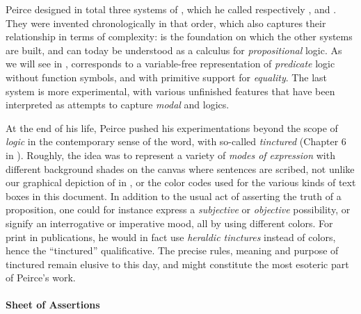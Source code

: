 \begin{scope}
\AP
Peirce designed in total three systems of , which he called respectively
,  and . They were invented
chronologically in that order, which also captures their relationship in terms
of complexity:  is the foundation on which the other systems are
built, and can today be understood as a  calculus for 
\emph{propositional} logic. As we will see in , 
corresponds to a variable-free representation of \emph{predicate} logic without
function symbols, and with primitive support for \emph{equality}. The last
system  is more experimental, with various unfinished features that
have been interpreted as attempts to capture \emph{modal}
 and \emph{} logics.

\begin{digression}
At the end of his life, Peirce pushed his experimentations beyond the scope of
\emph{logic} in the contemporary sense of the word, with so-called
\emph{tinctured}  (Chapter 6 in \cite{Roberts+1973}).
Roughly, the idea was to represent a variety of \emph{modes of expression} with
different background shades on the canvas where sentences are scribed, not
unlike our graphical depiction of \emph{}  in
, or the color codes used for the various kinds of text
boxes in this document. In addition to the usual act of asserting the truth of a
proposition, one could for instance express a \emph{subjective} or
\emph{objective} possibility, or signify an interrogative or imperative mood,
all by using different colors. For print in publications, he would in fact use
\emph{heraldic tinctures} instead of colors, hence the ``tinctured''
qualificative. The precise rules, meaning and purpose of tinctured 
remain elusive to this day, and might constitute the most esoteric part of
Peirce's work.
\end{digression}

\paragraph{Sheet of Assertions}


\end{scope}
